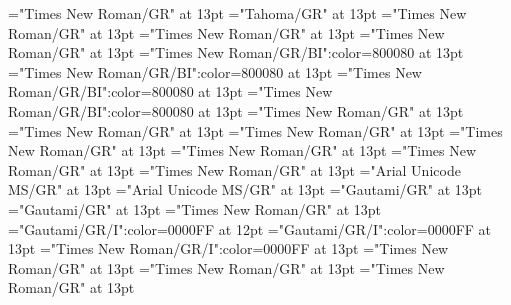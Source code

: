 \documentclass[a4paper]{article}
\begin{document}
\font\spanenpronunciationggofonipaxemicpronunciationsentryletDatadicBody="Times New Roman/GR" at 13pt
\font\spanggofonipaxemicpronunciationggofonipaxemicpronunciationsentryletDatadicBody="Tahoma/GR" at 13pt
\font\spanenpronunciationsentryletDatadicBody="Times New Roman/GR" at 13pt
\font\sensesentryletDatadicBody="Times New Roman/GR" at 13pt
\font\sensesensesentryletDatadicBody="Times New Roman/GR" at 13pt
\font\grammaticalinfosensesensesentryletDatadicBody="Times New Roman/GR/BI":color=800080 at 13pt
\font\partofspeechengrammaticalinfosensesensesentryletDatadicBody="Times New Roman/GR/BI":color=800080 at 13pt
\font\spanenpartofspeechengrammaticalinfosensesensesentryletDatadicBody="Times New Roman/GR/BI":color=800080 at 13pt
\font\spanengrammaticalinfosensesensesentryletDatadicBody="Times New Roman/GR/BI":color=800080 at 13pt
\font{}="Times New Roman/GR" at 13pt
\font\spanendefinitionensensesensesentryletDatadicBody="Times New Roman/GR" at 13pt
\font\LexSensepublishStemDefinitionPubensensesensesentryletDatadicBody="Times New Roman/GR" at 13pt
\font\spanenLexSensepublishStemDefinitionPubensensesensesentryletDatadicBody="Times New Roman/GR" at 13pt
\font\LexSensepublishStemGlossPubLcensensesensesentryletDatadicBody="Times New Roman/GR" at 13pt
\font\xitemenLexSensepublishStemGlossPubLcensensesensesentryletDatadicBody="Times New Roman/GR" at 13pt
\font\spanenxitemenLexSensepublishStemGlossPubLcensensesensesentryletDatadicBody="Times New Roman/GR" at 13pt
\font\xitemhiLexSensepublishStemGlossPubLcensensesensesentryletDatadicBody="Arial Unicode MS/GR" at 13pt
\font\spanhixitemhiLexSensepublishStemGlossPubLcensensesensesentryletDatadicBody="Arial Unicode MS/GR" at 13pt
\font\xitemteLexSensepublishStemGlossPubLcensensesensesentryletDatadicBody="Gautami/GR" at 13pt
\font\spantexitemteLexSensepublishStemGlossPubLcensensesensesentryletDatadicBody="Gautami/GR" at 13pt
\font\examplessensesensesentryletDatadicBody="Times New Roman/GR" at 13pt
\font\exampleggoTeluINexamplessensesensesentryletDatadicBody="Gautami/GR/I":color=0000FF at 12pt
\font\spanggoTeluINexampleggoTeluINexamplessensesensesentryletDatadicBody="Gautami/GR/I":color=0000FF at 13pt
\font\spanenexampleggoTeluINexamplessensesensesentryletDatadicBody="Times New Roman/GR/I":color=0000FF at 13pt
\font\translationsexamplessensesensesentryletDatadicBody="Times New Roman/GR" at 13pt
\font\CmTranslationpublishStemTypeConfigtranslationsexamplessensesensesentryletDatadicBody="Times New Roman/GR" at 13pt
\font\CmPossibilitypublishStemTransTypeAbbreviationPubenCmTranslationpublishStemTypeConfigtranslationsexamplessensesensesentryletDatadicBody="Times New Roman/GR" at 13pt
\end{document}
